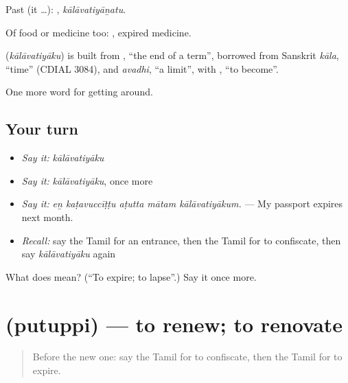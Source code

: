 Past (it …): , \emph{kālāvatiyāṉatu}.

Of food or medicine too:  , expired medicine.

\begin{cousinweb}
\textbf{} (\emph{kālāvatiyāku}) is built from , \textquotedblleft{}the end of a term\textquotedblright{}, borrowed from Sanskrit \emph{kāla}, \textquotedblleft{}time\textquotedblright{} (CDIAL 3084), and \emph{avadhi}, \textquotedblleft{}a limit\textquotedblright{}, with , \textquotedblleft{}to become\textquotedblright{}.
\end{cousinweb}

\begin{grammarlens}[title={What you've built}]
One more word for getting around.
\end{grammarlens}

\subsection*{Your turn}
\begin{itemize}
\raggedright
  \item \emph{Say it:} \emph{kālāvatiyāku}
  \item \emph{Say it:} \emph{kālāvatiyāku}, once more
  \item \emph{Say it:} \emph{eṉ kaṭavuccīṭṭu aṭutta mātam kālāvatiyākum.} — My passport expires next month.
  \item \emph{Recall:} say the Tamil for an entrance, then the Tamil for to confiscate, then say \emph{kālāvatiyāku} again
\end{itemize}

\begin{tcolorbox}[breakable,colback=teal!4,colframe=teal!35!black,title={Before you move on}]
What does  mean? (\textquotedblleft{}To expire; to lapse\textquotedblright{}.) Say it once more.
\end{tcolorbox}
\section[\texorpdfstring{\ta{புதுப்பி} (putuppi)}{புதுப்பி (putuppi)}]{ (putuppi) — to renew; to renovate}

\label{lesson:TA-C415-putuppi}



\begin{quote}
Before the new one: say the Tamil for to confiscate, then the Tamil for to expire.
\end{quote}

